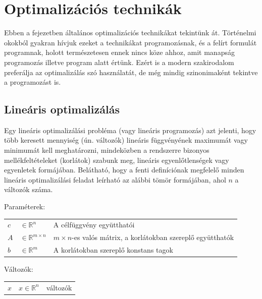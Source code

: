 
\chapter{Optimalizációs technikák}\label{chap:optimalization}
Ebben a fejezetben általános optimalizációs technikákat tekintünk át. Történelmi okokból gyakran hívjuk ezeket a technikákat programozásnak, és a felírt formulát programnak, holott természetesen ennek nincs köze ahhoz, amit manapság programozás illetve program alatt értünk. Ezért is a modern szakirodalom preferálja az optimalizálás szó használatát, de még mindig szinonimaként tekintve a programozást is.



\section{Lineáris optimalizálás}

Egy lineáris optimalizálási probléma (vagy lineáris programozás) azt jelenti, hogy több keresett mennyiség (ún. változók) lineáris függvényének maximumát vagy minimumát kell meghatározni, mindeközben a rendszerre bizonyos mellékfeltételeket (korlátok) szabunk meg, lineáris egyenlőtlenségek vagy egyenletek formájában.
Belátható, hogy a fenti definíciónak megfelelő minden lineáris optimalizálási feladat leírható az alábbi tömör formájában, ahol $n$ a változók száma.

Paraméterek:

\begin{tabular}{lll}
	$c$ & $\in \mathbb{R}^n$   & A célfüggvény együtthatói \\
	$A$ & $\in \mathbb{R}^{m×n}$  & $m × n$-es valós mátrix, a korlátokban szereplő együtthatók \\
	$b$ & $\in \mathbb{R}^m$   & A korlátokban szereplő konstans tagok \\
\end{tabular}

Változók:

\begin{tabular}{lll}
	$x$ & $x \in \mathbb{R}^n$ & változók \\
\end{tabular}


